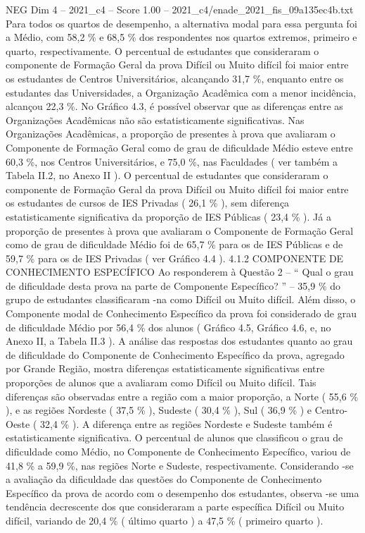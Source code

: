 \begin{textsample}{NEG Dim 4 – 2021\_c4 – Score 1.00 – 2021\_c4/enade\_2021\_fis\_09a135ec4b.txt}
Para todos os quartos de desempenho, a alternativa modal para essa pergunta foi a Médio, com 58,2 \% e 68,5 \% dos respondentes nos quartos extremos, primeiro e quarto, respectivamente.
O percentual de estudantes que consideraram o componente de Formação Geral da prova Difícil ou Muito difícil foi maior entre os estudantes de Centros Universitários, alcançando 31,7 \%, enquanto entre os estudantes das Universidades, a Organização Acadêmica com a menor incidência, alcançou 22,3 \%.
No Gráfico 4.3, é possível observar que as diferenças entre as Organizações Acadêmicas não são estatisticamente significativas.
Nas Organizações Acadêmicas, a proporção de presentes à prova que avaliaram o Componente de Formação Geral como de grau de dificuldade Médio esteve entre 60,3 \%, nos Centros Universitários, e 75,0 \%, nas Faculdades ( ver também a Tabela II.2, no Anexo II ).
O percentual de estudantes que consideraram o componente de Formação Geral da prova Difícil ou Muito difícil foi maior entre os estudantes de cursos de IES Privadas ( 26,1 \% ), sem diferença estatisticamente significativa da proporção de IES Públicas ( 23,4 \% ).
Já a proporção de presentes à prova que avaliaram o Componente de Formação Geral como de grau de dificuldade Médio foi de 65,7 \% para os de IES Públicas e de 59,7 \% para os de IES Privadas ( ver Gráfico 4.4 ). 4.1.2 COMPONENTE DE CONHECIMENTO ESPECÍFICO Ao responderem à Questão 2 – “ Qual o grau de dificuldade desta prova na parte de Componente Específico? ” – 35,9 \% do grupo de estudantes classificaram -na como Difícil ou Muito difícil.
Além disso, o Componente modal de Conhecimento Específico da prova foi considerado de grau de dificuldade Médio por 56,4 \% dos alunos ( Gráfico 4.5, Gráfico 4.6, e, no Anexo II, a Tabela II.3 ).
A análise das respostas dos estudantes quanto ao grau de dificuldade do Componente de Conhecimento Específico da prova, agregado por Grande Região, mostra diferenças estatisticamente significativas entre proporções de alunos que a avaliaram como Difícil ou Muito difícil.
Tais diferenças são observadas entre a região com a maior proporção, a Norte ( 55,6 \% ), e as regiões Nordeste ( 37,5 \% ), Sudeste ( 30,4 \% ), Sul ( 36,9 \% ) e Centro-Oeste ( 32,4 \% ).
A diferença entre as regiões Nordeste e Sudeste também é estatisticamente significativa.
O percentual de alunos que classificou o grau de dificuldade como Médio, no Componente de Conhecimento Específico, variou de 41,8 \% a 59,9 \%, nas regiões Norte e Sudeste, respectivamente.
Considerando -se a avaliação da dificuldade das questões do Componente de Conhecimento Específico da prova de acordo com o desempenho dos estudantes, observa -se uma tendência decrescente dos que consideraram a parte específica Difícil ou Muito difícil, variando de 20,4 \% ( último quarto ) a 47,5 \% ( primeiro quarto ).

\end{textsample}
